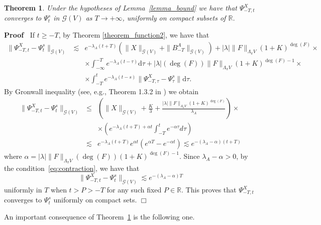 \documentclass{article}
\newcommand{\mathd}{\mathrm{d}}
\newenvironment{proof}{\noindent\textbf{Proof\ }}{\hspace*{\fill}$\Box$\medskip}
\newtheorem{theorem}{Theorem}
\begin{document}
\begin{theorem}
  \label{theorem_approximation}Under the hypotheses of Lemma~\ref{lemma_bound}
  we have that $\Psi_{- T, t}^X$ converges to $\Psi^s_t$ in $\mathcal{G} (V)$
  as $T \rightarrow + \infty$, uniformly on compact subsets of $\mathbb{R}$.
\end{theorem}

\begin{proof}
  If $t \geqslant - T$, by Theorem \ref{theorem_function2}, we have that
  \begin{eqnarray}
    \| \Psi_{- T, t}^X - \Psi_t^s \|_{\mathcal{G} (V)} & \lesssim & e^{-
    \lambda_A (t + T)} (\| X \|_{\mathcal{G} (V)} + \| B_{- T}^A
    \|_{\mathcal{G} (V)}) + | \lambda | \| F \|_{\Lambda_{\pi} V} (1 +
    K)^{\deg (F)} \times \nonumber\\
    &  & \times \int_{- \infty}^{- T} e^{- \lambda_A (t - \tau)} \mathd \tau
    + | \lambda | (\deg (F)) \| F \|_{\Lambda_{\pi} V} (1 + K)^{\deg (F) - 1}
    \times \nonumber\\
    &  & \times \int_{- T}^t e^{- \lambda_A (t - s)} \| \Psi_{- T, \tau}^X -
    \Psi_{\tau}^s \| \mathd \tau . \nonumber
  \end{eqnarray}
  By Gronwall inequality (see, e.g., Theorem 1.3.2 in {\cite{Pachpatte1998}})
  we obtain
  \begin{eqnarray}
    \| \Psi_{- T, t}^X - \Psi_t^s \|_{\mathcal{G} (V)} & \leqslant & \left( \|
    X \|_{\mathcal{G} (V)} + \frac{K}{3} + \frac{| \lambda | \| F
    \|_{\Lambda_{\pi} V} (1 + K)^{\deg (F)}}{\lambda_A} \right) \times
    \nonumber\\
    &  & \times \left( e^{- \lambda_A (t + T) + \alpha t} \int_{- T}^t e^{-
    \alpha \tau} d \tau \right) \nonumber\\
    & \lesssim & e^{- \lambda_A (t + T)} e^{\alpha t} (e^{\alpha T} - e^{-
    \alpha t}) \lesssim e^{- (\lambda_A - \alpha) (t + T)} \nonumber
  \end{eqnarray}
  where $\alpha = | \lambda | \| F \|_{\Lambda_{\pi} V} (\deg (F)) (1 +
  K)^{\deg (F) - 1}$. Since $\lambda_A - \alpha > 0$, by the
  condition~{\eqref{eq:contraction}}, we have that
  \[ \| \Psi_{- T, t}^X - \Psi_t^s \|_{\mathcal{G} (V)} \lesssim e^{-
     (\lambda_A - \alpha) T} \]
  uniformly in $T$ when $t > P > - T$ for any such fixed $P \in \mathbb{R}$.
  This proves that $\Psi_{- T, t}^X$ converges to $\Psi_t^s$ uniformly on
  compact sets.
\end{proof}

An important consequence of Theorem~\ref{theorem_approximation} is the
following one.
\end{document}
